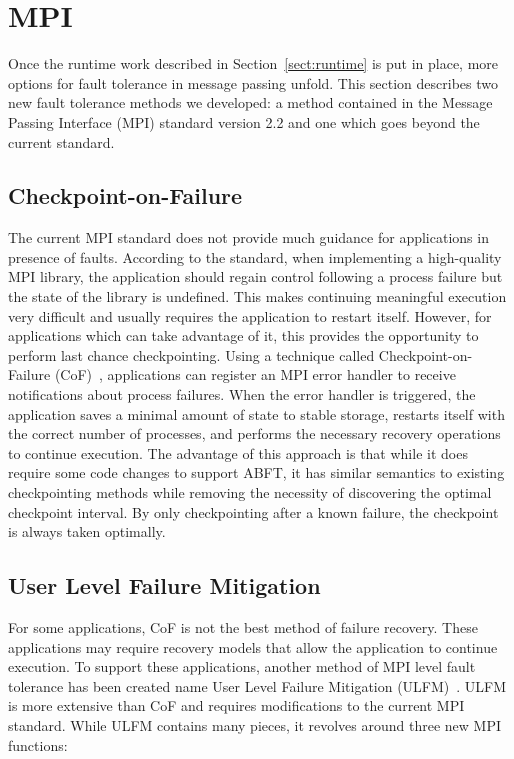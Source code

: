 \section{MPI} \label{sect:mpi}

Once the runtime work described in Section~\ref{sect:runtime} is put in place, more options for fault tolerance in message passing unfold. This section describes two new fault tolerance methods we developed: a method contained in the Message Passing Interface (MPI) standard version 2.2 and one which goes beyond the current standard.

\subsection{Checkpoint-on-Failure} \label{subsect:cof}

The current MPI standard does not provide much guidance for applications in presence of faults. According to the standard, when implementing a high-quality MPI library, the application should regain control following a process failure but the state of the library is undefined. This makes continuing meaningful execution very difficult and usually requires the application to restart itself. However, for applications which can take advantage of it, this provides the opportunity to perform last chance checkpointing. Using a technique called Checkpoint-on-Failure (CoF)~\cite{Bland:EuroPar12}, applications can register an MPI error handler to receive notifications about process failures. When the error handler is triggered, the application saves a minimal amount of state to stable storage, restarts itself with the correct number of processes, and performs the necessary recovery operations to continue execution. The advantage of this approach is that while it does require some code changes to support ABFT, it has similar semantics to existing checkpointing methods while removing the necessity of discovering the optimal checkpoint interval. By only checkpointing after a known failure, the checkpoint is always taken optimally.

\subsection{User Level Failure Mitigation} \label{subsect:ulfm}

For some applications, CoF is not the best method of failure recovery. These applications may require recovery models that allow the application to continue execution. To support these applications, another method of MPI level fault tolerance has been created name User Level Failure Mitigation (ULFM)~\cite{Bland:EuroMPI12}. ULFM is more extensive than CoF and requires modifications to the current MPI standard. While ULFM contains many pieces, it revolves around three new MPI functions:

